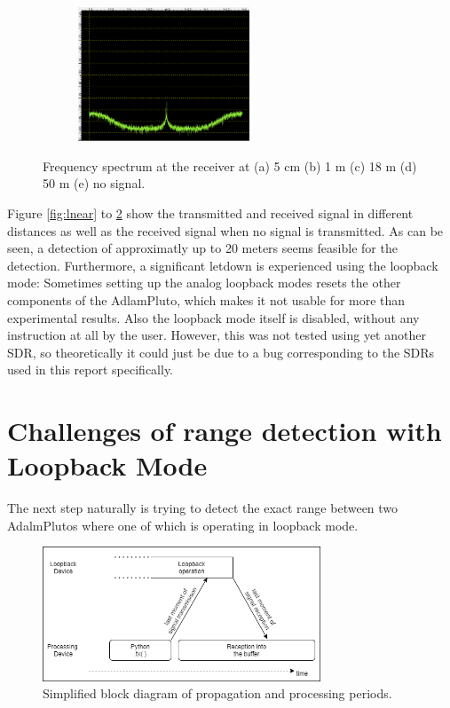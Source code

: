 \documentclass[journal]{IEEEtran}
\begin{document}
\begin{figure}
\begin{subfigure}[b]{0.45\textwidth}
   \includegraphics[width=1\linewidth, height=4cm]{fig/loopback_nosignal.PNG}
   \caption{}
   \label{fig:lnosig} 
\end{subfigure}

\caption{ Frequency spectrum at the receiver at (a) 5 cm (b) 1 m (c) 18 m (d) 50 m (e) no signal.  }
\end{figure}

Figure \ref{fig:lnear} to \ref{fig:lnosig} show the transmitted and received signal in different distances as well as the received signal when no signal is transmitted.
As can be seen, a detection of approximatly up to 20 meters seems feasible for the detection. 
Furthermore, a significant letdown is experienced using the loopback mode:
Sometimes setting up the analog loopback modes resets the other components of the AdlamPluto, which makes it not usable for more than experimental results. Also the loopback mode itself is disabled, without any instruction at all by the user.
However, this was not tested using yet another SDR, so theoretically it could just be due to a bug corresponding to the SDRs used in this report specifically. 


\section{Challenges of range detection with Loopback Mode}
\label{sec:ChallengeDetection}
The next step naturally is trying to detect the exact range between two AdalmPlutos where one of which is operating in loopback mode.

\begin{figure}
   \includegraphics[width=1\linewidth, height=4cm]{fig/periods_block.png}
   \caption{ Simplified block diagram of propagation and processing periods. }
   \label{fig:block}
\end{figure}
\end{document}
